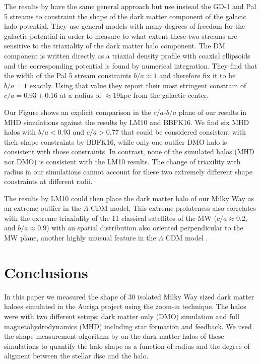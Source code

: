 \documentclass[usenatbib]{mnras}
\begin{document}
The results by \cite{Bovy16} have the same general approach but use
instead the GD-1 \citep{2006ApJ...641L..37G} and Pal 5 \citep{2009AJ....137.3378O}
streams to constraint the shape of the dark matter component of the
galacic halo potential.
They use general models with many degrees of freedom for the galactic
potential in order to measure to what extent these two streams are sensitive
to the triaxiality of the dark matter halo component.
The DM component is written directly as a triaxial density profile
with coaxial ellipsoids and the corresponding potential is found by
numerical integration.
They find that the width of the Pal 5 stream constraints $b/a\approx
1$ and therefore fix it to be $b/a=1$ exactly.
Using that value they report their most stringent constrain of
$c/a=0.93\pm0.16$ at a radius of $\approx 19$kpc from the galactic
center. 

Our Figure \label{fig:observations} shows an explicit comparison in
the $c/a$-$b/a$ plane of our results in MHD simulations against the
results by LM10 and BBFK16.  
We find six MHD halos with $b/a<0.93$ and $c/a>0.77$ that could be
considered consistent with their shape constraints  by BBFK16, while
only one outlier DMO halo is consistent with those constraints.
In contrast, none of the simulated halos (MHD nor DMO) is consistent
with the LM10 results. 
The change of triaxility with radius in our simulations cannot account
for these two extremely different shape constraints at different
radii. 


The results by LM10 could then place the dark matter halo of our Milky
Way as an extreme outlier in the $\Lambda$ CDM model. 
This extreme prolateness also correlates with the extreme
triaxiality of the 11 classical satellites of the MW ($c/a\approx
0.2$, and $b/a\approx0.9$) with an spatial distribution 
also oriented perpendicular to the MW plane, another highly unusual
feature in the $\Lambda$ CDM model \citep{2018MNRAS.478.5533F}.


\section{Conclusions}
\label{sec:conclusions}

In this paper we measured the shape of 30 isolated Milky Way sized
dark matter haloes simulated in the Auriga project using the zoom-in
technique. 
The halos were with two different setups:
dark matter only (DMO) simulation and full magnetohydrodynamics (MHD)
including star formation and feedback.
We used the shape measurement algorithm by \cite{Allgood06} on the
dark matter halos of these simulations to quantify the halo shape as a
function of radius and the degree of aligment between the stellar disc
and the halo. 
\end{document}
